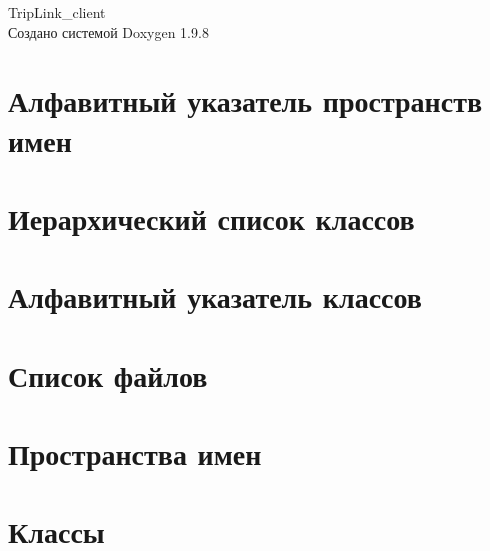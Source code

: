 \documentclass[twoside]{book}
\newcommand{\+}{\discretionary{\mbox{\scriptsize$\hookleftarrow$}}{}{}}
\newcommand{\clearemptydoublepage}{%
    \newpage{\pagestyle{empty}\cleardoublepage}%
  }
\begin{document}
  \raggedbottom
    \hypersetup{pageanchor=false,
                bookmarksnumbered=true,
                pdfencoding=unicode
               }
  \begin{titlepage}
  \vspace*{7cm}
  \begin{center}%
  {\Large Trip\+Link\+\_\+client}\\
  \vspace*{1cm}
  {\large Создано системой Doxygen 1.9.8}\\
  \end{center}
  \end{titlepage}
  \clearemptydoublepage
  \tableofcontents
  \clearemptydoublepage
  \hypersetup{pageanchor=true}
\chapter{Алфавитный указатель пространств имен}

\chapter{Иерархический список классов}

\chapter{Алфавитный указатель классов}

\chapter{Список файлов}

\chapter{Пространства имен}

\chapter{Классы}











\end{document}
